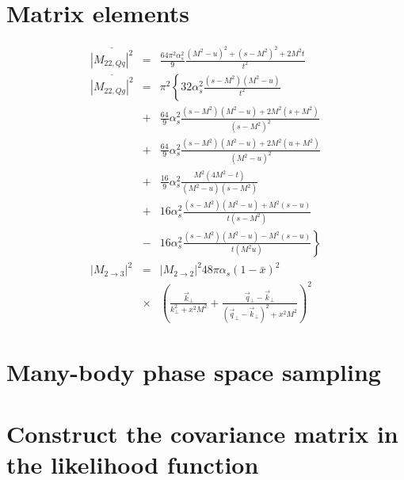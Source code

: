 \documentclass[aps, prc, reprint, amsmath, groupedaddress, nofootinbib]{revtex4-1}
\begin{document}
\begin{appendices}

\section{Matrix elements}
\label{appendix:matrix-element}
\begin{eqnarray}
\overline{|M_{22,Qq}|^2} &=& \frac{64\pi^2\alpha_s^2}{9} \frac{(M^2-u)^2 + (s-M^2)^2 + 2 M^2 t}{t^2}
\nonumber
\\
\overline{|M_{22,Qg}|^2} &=& \pi^2 \left\{
32\alpha_s^2 \frac{(s-M^2)(M^2-u)}{t^2} \right.
\nonumber
\\
&+&\frac{64}{9}\alpha_s^2 \frac{(s-M^2)(M^2-u)+2M^2(s+M^2)}{(s-M^2)^2} \nonumber
\\
&+&\frac{64}{9}\alpha_s^2 \frac{(s-M^2)(M^2-u)+2M^2(u+M^2)}{(M^2-u)^2} \nonumber
\\
&+& \frac{16}{9}\alpha_s^2 \frac{M^2(4M^2 - t)}{(M^2-u)(s-M^2)} 
\nonumber
\\
&+& 16 \alpha_s^2 \frac{(s-M^2)(M^2-u)+M^2(s-u)}{t(s-M^2)}
\nonumber
\\
&-& \left. 16 \alpha_s^2 \frac{(s-M^2)(M^2-u)-M^2(s-u)}{t(M^2u)}\right\}
\nonumber
\\
|M_{2\rightarrow 3}|^2 &=& |M_{2\rightarrow 2}|^2 48 \pi \alpha_s (1-\bar{x})^2
\nonumber
\\
&\times&\left(\frac{\vec{k}_\perp}{k_\perp^2 + x^2 M^2} + \frac{\vec{q}_\perp - \vec{k}_\perp}{(\vec{q}_\perp-\vec{k}_\perp)^2 + x^2 M^2}
\right)^2 
\end{eqnarray}

\section{Many-body phase space sampling}
\label{appendix:sample}

\section{Construct the covariance matrix in the likelihood function}
\label{appendix:sigma}

\end{appendices}
 
\end{document}

